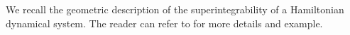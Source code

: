 \documentclass[11pt,reqno]{amsart}
\newtheorem*{theorem A}{Main Theorem A}
\newtheorem*{theorem B}{Main Theorem B}
\newtheorem*{theorem C}{Main Theorem C}
\newtheorem*{theorem D}{Main Theorem D}
\theoremstyle{definition}
\newtheorem{definition}[theorem]{Definition}
\theoremstyle{plain}
\theoremstyle{conclusion}
\begin{document}

We recall the geometric description of the superintegrability of a Hamiltonian dynamical system. The reader can refer to \cite{MR3493688} for more details and example. 


\end{document}
